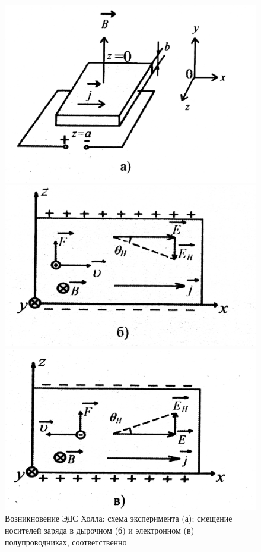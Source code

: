 \documentclass[a4paper,14pt]{extarticle}
\begin{document}
\begin{figure}[h!]
\begin{minipage}[h]{0.329\linewidth}
		\centering
	\includegraphics[width=\linewidth]{fig/21a}
\end{minipage}
\begin{minipage}[h]{0.329\linewidth}
		\centering
	\includegraphics[width=\linewidth]{fig/21b}
\end{minipage}
\begin{minipage}[h]{0.329\linewidth}
		\centering
	\includegraphics[width=\linewidth]{fig/21c}
\end{minipage}
	\caption{Возникновение ЭДС Холла: схема эксперимента (а); смещение носителей заряда в дырочном (б) и электронном (в) полупроводниках, соответственно}
	\label{fig:8}
\end{figure}
\end{document}
